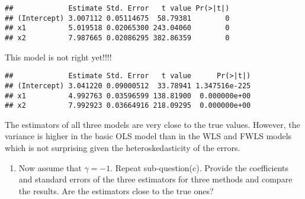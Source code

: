 \documentclass[
]{article}
\newenvironment{Shaded}{\begin{snugshade}}{\end{snugshade}}
\newcommand{\AttributeTok}[1]{\textcolor[rgb]{0.77,0.63,0.00}{#1}}
\newcommand{\CommentTok}[1]{\textcolor[rgb]{0.56,0.35,0.01}{\textit{#1}}}
\newcommand{\DecValTok}[1]{\textcolor[rgb]{0.00,0.00,0.81}{#1}}
\newcommand{\FunctionTok}[1]{\textcolor[rgb]{0.00,0.00,0.00}{#1}}
\newcommand{\NormalTok}[1]{#1}
\newcommand{\OtherTok}[1]{\textcolor[rgb]{0.56,0.35,0.01}{#1}}
\newcommand{\SpecialCharTok}[1]{\textcolor[rgb]{0.00,0.00,0.00}{#1}}
\providecommand{\tightlist}{%
  \setlength{\itemsep}{0pt}\setlength{\parskip}{0pt}}
\begin{document}
\begin{verbatim}
##             Estimate Std. Error   t value Pr(>|t|)
## (Intercept) 3.007112 0.05114675  58.79381        0
## x1          5.019518 0.02065300 243.04060        0
## x2          7.987665 0.02086295 382.86359        0
\end{verbatim}

This model is not right yet!!!!

\begin{Shaded}
\end{Shaded}

\begin{verbatim}
##             Estimate Std. Error   t value      Pr(>|t|)
## (Intercept) 3.041220 0.09000512  33.78941 1.347516e-225
## x1          4.992763 0.03596599 138.81900  0.000000e+00
## x2          7.992923 0.03664916 218.09295  0.000000e+00
\end{verbatim}

The estimators of all three models are very close to the true values.
However, the variance is higher in the basic OLS model than in the WLS
and FWLS models which is not surprising given the heteroskedasticity of
the errors.

\begin{enumerate}
\def\labelenumi{\alph{enumi})}
\setcounter{enumi}{4}
\tightlist
\item
  Now assume that \(\gamma = −1\). Repeat sub-question(c). Provide the
  coefficients and standard errors of the three estimators for three
  methods and compare the results. Are the estimators close to the true
  ones?
\end{enumerate}
\end{document}
